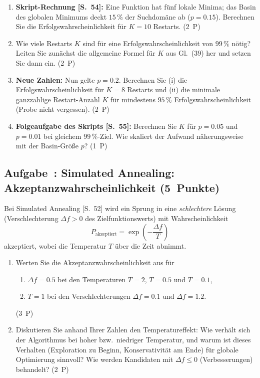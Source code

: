 \documentclass[a4paper,11pt]{scrartcl}
\newcounter{aufgabe}
\newcommand{\Aufgabe}[2]{%
  \refstepcounter{aufgabe}%
  \subsection*{Aufgabe~\theaufgabe: #1 \hfill (#2~Punkte)}%
  \label{auf:\theaufgabe}}
\begin{document}
\begin{enumerate}[label=(\alph*)]
  \item \textbf{Skript-Rechnung [S.~54]:} Eine Funktion hat fünf lokale Minima; das
        Basin des globalen Minimums deckt $15\,\%$ der Suchdomäne ab ($p = 0.15$).
        Berechnen Sie die Erfolgswahrscheinlichkeit für $K = 10$ Restarts. \hfill (2~P)
  \item Wie viele Restarts $K$ sind für eine Erfolgswahrscheinlichkeit von $99\,\%$
        nötig? Leiten Sie zunächst die allgemeine Formel für $K$ aus Gl.~(39) her und
        setzen Sie dann ein. \hfill (2~P)
  \item \textbf{Neue Zahlen:} Nun gelte $p = 0.2$. Berechnen Sie (i) die
        Erfolgswahrscheinlichkeit für $K = 8$ Restarts und (ii) die minimale ganzzahlige
        Restart-Anzahl $K$ für mindestens $95\,\%$ Erfolgswahrscheinlichkeit
        (Probe nicht vergessen). \hfill (2~P)
  \item \textbf{Folgeaufgabe des Skripts [S.~55]:} Berechnen Sie $K$ für $p = 0.05$ und
        $p = 0.01$ bei gleichem $99\,\%$-Ziel. Wie skaliert der Aufwand näherungsweise
        mit der Basin-Größe $p$? \hfill (1~P)
\end{enumerate}

\schreibraum[10]
\Aufgabe{Simulated Annealing: Akzeptanzwahrscheinlichkeit}{5}

Bei Simulated Annealing [S.~52] wird ein Sprung in eine \emph{schlechtere} Lösung
(Verschlechterung $\Delta f > 0$ des Zielfunktionswerts) mit Wahrscheinlichkeit
\[
  P_{\text{akzeptiert}} = \exp\!\left(-\frac{\Delta f}{T}\right)
\]
akzeptiert, wobei die Temperatur $T$ über die Zeit abnimmt.

\begin{enumerate}[label=(\alph*)]
  \item Werten Sie die Akzeptanzwahrscheinlichkeit aus für
        \begin{enumerate}[label=(\roman*)]
          \item $\Delta f = 0.5$ bei den Temperaturen $T = 2$, $T = 0.5$ und $T = 0.1$,
          \item $T = 1$ bei den Verschlechterungen $\Delta f = 0.1$ und $\Delta f = 1.2$.
        \end{enumerate} \hfill (3~P)
  \item Diskutieren Sie anhand Ihrer Zahlen den Temperatureffekt: Wie verhält sich der
        Algorithmus bei hoher bzw.\ niedriger Temperatur, und warum ist dieses Verhalten
        (Exploration zu Beginn, Konservativität am Ende) für globale Optimierung
        sinnvoll? Wie werden Kandidaten mit $\Delta f \leq 0$ (Verbesserungen)
        behandelt? \hfill (2~P)
\end{enumerate}
\end{document}
